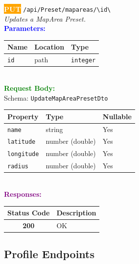 \begin{tcolorbox}[
    colback=orange!5,
    colframe=orange,
    arc=2mm,
    boxrule=1pt,
    left=5pt,
    right=5pt,
    top=5pt,
    bottom=5pt
]
\noindent\colorbox{orange}{\textcolor{white}{\textbf{PUT}}} 
\texttt{\large /api/Preset/mapareas/\textbackslash{}{id\textbackslash{}}}\\[0.3em]
\textit{Updates a MapArea Preset.}\\[0.3em]
\vspace{0.3em}
\textbf{\textcolor{blue}{Parameters:}}\\[0.2em]
\begin{tabular}{|l|l|l|}
\hline
\rowcolor{gray!20}
\textbf{Name} & \textbf{Location} & \textbf{Type} \\ \hline
\texttt{id} & path & \texttt{integer} \\ \hline
\end{tabular}\\[0.5em]
\vspace{0.3em}
\textbf{\textcolor{green}{Request Body:}}\\[0.2em]
Schema: \texttt{UpdateMapAreaPresetDto}\\[0.3em]
\begin{tabular}{|l|l|l|}
\hline
\rowcolor{green!10}
\textbf{Property} & \textbf{Type} & \textbf{Nullable} \\ \hline
\texttt{name} & string & Yes \\ \hline
\rowcolor{gray!5}
\texttt{latitude} & number (double) & Yes \\ \hline
\texttt{longitude} & number (double) & Yes \\ \hline
\rowcolor{gray!5}
\texttt{radius} & number (double) & Yes \\ \hline
\end{tabular}\\[0.5em]
\vspace{0.3em}
\textbf{\textcolor{purple}{Responses:}}\\[0.2em]
\begin{tabular}{|c|p{10cm}|}
\hline
\rowcolor{gray!20}
\textbf{Status Code} & \textbf{Description} \\ \hline
\colorbox{green!20}{\textbf{200}} & OK \\ \hline
\end{tabular}
\end{tcolorbox}
\vspace{0.5em}

\subsection{Profile Endpoints}

